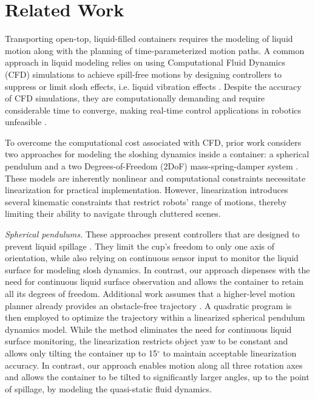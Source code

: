 \section{Related Work}
Transporting open-top, liquid-filled containers requires the modeling of liquid motion along with the planning of time-parameterized motion paths.
A common approach in liquid modeling relies on using Computational Fluid Dynamics (CFD) simulations to achieve spill-free motions by designing controllers to suppress or limit slosh effects, i.e. liquid vibration effects \cite{cfdbook1, cfdbook2}.
Despite the accuracy of CFD simulations, they are computationally demanding and require considerable time to converge, making real-time control applications in robotics unfeasible \cite{cfd1, cfd2, meal1}. 

To overcome the computational cost associated with CFD, prior work considers two approaches for modeling the sloshing dynamics inside a container: a spherical pendulum \cite{pendulum, spill1, pendulum2019} and a two Degrees-of-Freedom (2DoF) mass-spring-damper system \cite{springdamper2021, springdamper2022}. 
These models are inherently nonlinear and computational constraints necessitate linearization for practical implementation. However, linearization introduces several kinematic constraints that restrict robots' range of motions, thereby limiting their ability to navigate through cluttered scenes.

\textit{Spherical pendulums.} These approaches present controllers that are designed to prevent liquid spillage \cite{spill1, pendulum2019}.
They limit the cup's freedom to only one axis of orientation, while also relying on continuous sensor input to monitor the liquid surface for modeling slosh dynamics. In contrast, our approach dispenses with the need for continuous liquid surface observation and allows the container to retain all its degrees of freedom.
Additional work assumes that a higher-level motion planner already provides an obstacle-free trajectory \cite{pendulum}. A quadratic program is then employed to optimize the trajectory within a linearized spherical pendulum dynamics model. While the method eliminates the need for continuous liquid surface monitoring, the linearization restricts object yaw to be constant and allows only tilting the container up to 15$^{\circ}$ to maintain acceptable linearization accuracy. In contrast, our approach enables motion along all three rotation axes and allows the container to be tilted to significantly larger angles, up to the point of spillage, by modeling the quasi-static fluid dynamics.


